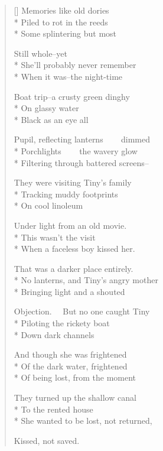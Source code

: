 \label{ch:night_reflections}
\settowidth{\versewidth}{Pupil, reflecting lanterns     dimmed}
\begin{verse}[\versewidth]
Memories like old dories\\*
Piled to rot in the reeds\\*
Some splintering but most

Still whole--yet\\*
She'll probably never remember\\*
When it was--the night-time

Boat trip--a crusty green dinghy\\*
On glassy water\\*
Black as an eye all

Pupil, reflecting lanterns     dimmed\\*
Porchlights     the wavery glow\\*
Filtering through battered screens--

They were visiting Tiny's family\\*
Tracking muddy footprints\\*
On cool linoleum

Under light from an old movie.\\*
This wasn't the visit\\*
When a faceless boy kissed her.

That was a darker place entirely.\\*
No lanterns, and Tiny's angry mother\\*
Bringing light and a shouted

Objection.   But no one caught Tiny\\*
Piloting the rickety boat\\*
Down dark channels

And though she was frightened\\*
Of the dark water, frightened\\*
Of being lost, from the moment

They turned up the shallow canal\\*
To the rented house\\*
She wanted to be lost, not returned,

Kissed, not saved.
\end{verse}
